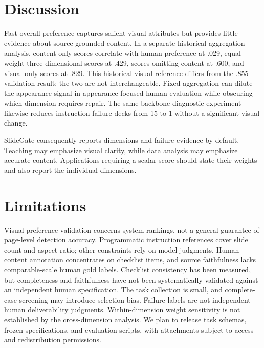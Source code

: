\section{Discussion}
Fast overall preference captures salient visual attributes but provides little evidence about source-grounded content. In a separate historical aggregation analysis, content-only scores correlate with human preference at .029, equal-weight three-dimensional scores at .429, scores omitting content at .600, and visual-only scores at .829. This historical visual reference differs from the .855 validation result; the two are not interchangeable. Fixed aggregation can dilute the appearance signal in appearance-focused human evaluation while obscuring which dimension requires repair. The same-backbone diagnostic experiment likewise reduces instruction-failure decks from 15 to 1 without a significant visual change.

SlideGate consequently reports dimensions and failure evidence by default. Teaching may emphasize visual clarity, while data analysis may emphasize accurate content. Applications requiring a scalar score should state their weights and also report the individual dimensions.

\section{Limitations}
Visual preference validation concerns system rankings, not a general guarantee of page-level detection accuracy. Programmatic instruction references cover slide count and aspect ratio; other constraints rely on model judgments. Human content annotation concentrates on checklist items, and source faithfulness lacks comparable-scale human gold labels. Checklist consistency has been measured, but completeness and faithfulness have not been systematically validated against an independent human specification. The task collection is small, and complete-case screening may introduce selection bias. Failure labels are not independent human deliverability judgments. Within-dimension weight sensitivity is not established by the cross-dimension analysis. We plan to release task schemas, frozen specifications, and evaluation scripts, with attachments subject to access and redistribution permissions.

